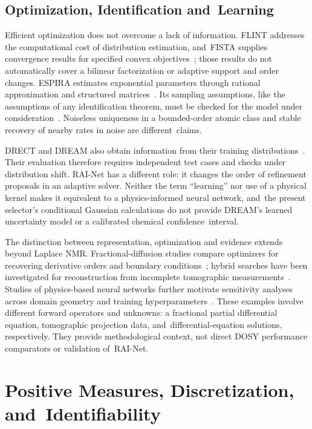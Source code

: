 \documentclass[mathematics,article,accept,moreauthors]{Definitions/mdpi}
\begin{document}
\subsection{Optimization, Identification and~Learning}
Efficient optimization does not overcome a lack of information. FLINT addresses the computational cost of distribution estimation, and~FISTA supplies convergence results for specified convex objectives~\cite{flint,fista}; those results do not automatically cover a bilinear factorization or adaptive support and order changes. ESPIRA estimates exponential parameters through rational approximation and structured matrices~\cite{espira}. Its sampling assumptions, like the assumptions of any identification theorem, must be checked for the model under consideration~\cite{teicher}. Noiseless uniqueness in a bounded-order atomic class and stable recovery of nearby rates in noise are different~claims.

DRECT and DREAM also obtain information from their training distributions~\cite{drect,dream}. Their evaluation therefore requires independent test cases and checks under distribution shift. RAI-Net has a different role: it changes the order of refinement proposals in an adaptive solver. Neither the term ``learning'' nor use of a physical kernel makes it equivalent to a physics-informed neural network, and~the present selector's conditional Gaussian calculations do not provide DREAM's learned uncertainty model or a calibrated chemical confidence~interval.

The distinction between representation, optimization and evidence extends beyond Laplace NMR. Fractional-diffusion studies compare optimizers for recovering derivative orders and boundary conditions~\cite{fractionalmeta}; hybrid searches have been investigated for reconstruction from incomplete tomographic measurements~\cite{hybridct}. Studies of physics-based neural networks further motivate sensitivity analyses across domain geometry and training hyperparameters~\cite{pinngeometry}. These examples involve different forward operators and unknowns: a fractional partial differential equation, tomographic projection data, and~differential-equation solutions, respectively. They provide methodological context, not direct DOSY performance comparators or validation of~RAI-Net.



%


\section{Positive Measures, Discretization, and~Identifiability}\label{sec:theory}
\end{document}
